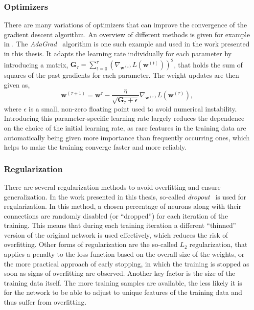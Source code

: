 \subsubsection{Optimizers}
There are many variations of optimizers that can improve the convergence of the gradient descent algorithm. An overview of different methods is given for example in . The \emph{AdaGrad}~\cite{adagrad-duchi} algorithm is one such example and used in the work presented in this thesis. It adapts the learning rate individually for each parameter by introducing a matrix, $\pmb{G}_{\tau} = \sum_{t=0}^{\tau} \left( \nabla_{\pmb{w}^{(t)}} L(\pmb{w}^{(t)}) \right)^2$, that holds the sum of squares of the past gradients for each parameter. 
The weight updates are then given as,
\begin{equation}
    \pmb{w}^{(\tau+1)} = \pmb{w}^\tau - \frac{\eta}{\sqrt{\pmb{G}_\tau + \epsilon}}  \nabla_{\pmb{w}^{(\tau)}} L(\pmb{w}^{(\tau)}), 
\end{equation}
where $\epsilon$ is a small, non-zero floating point used to avoid numerical instability.
Introducing this parameter-specific learning rate largely reduces the dependence on the choice of the initial learning rate, as rare features in the training data are automatically being given more importance than frequently occurring ones, which helps to make the training converge faster and more reliably.


\subsubsection{Regularization}
There are several regularization methods to avoid overfitting and ensure generalization. 
In the work presented in this thesis, so-called \emph{dropout}~\cite{srivastava_dropout_2014,DBLP:journals/corr/abs-1207-0580} is used for regularization. In this method, a chosen percentage of neurons along with their connections are randomly disabled (or ``dropped'') for each iteration of the training. This means that during each training iteration a different ``thinned'' version of the original network is used effectively, which reduces the risk of overfitting. 
Other forms of regularization are the so-called $L_2$ regularization, that applies a penalty to the loss function based on the overall size of the weights, or the more practical approach of early stopping, in which the training is stopped as soon as signs of overfitting are observed. 
Another key factor is the size of the training data itself. The more training samples are available, the less likely it is for the network to be able to adjust to unique features of the training data and thus suffer from overfitting.


